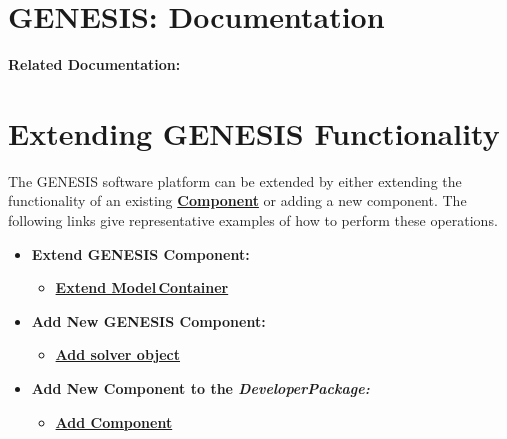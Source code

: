 \documentclass[12pt]{article}
\begin{document}
\section*{GENESIS: Documentation}

{\bf Related Documentation:}

\section*{Extending GENESIS Functionality}

The GENESIS software platform can be extended by either extending the functionality of an existing \href{../reserved-words/reserved-words.tex}{\bf Component} or adding a new component. The following links give representative examples of how to perform these operations.

\begin{itemize}
   \item[]{\bf Extend GENESIS Component:}
      \begin{itemize}
         \item[]\href{../genesis-extend-model-container/genesis-extend-model-container.tex}{\bf Extend Model\,Container}
      \end{itemize}
      
   \item[]{\bf Add New GENESIS Component:}
      \begin{itemize}
         \item[]\href{../genesis-add-object-solver/genesis-add-object-solver.tex}{\bf Add solver object}
      \end{itemize}
      
   \item[]{\bf Add New Component to the {\it DeveloperPackage:}}
      \begin{itemize}
         \item[]\href{../genesis-add-component-developerpackage/genesis-add-component-developerpackage.tex}{\bf Add Component}
      \end{itemize} 
\end{itemize}
\end{document}
